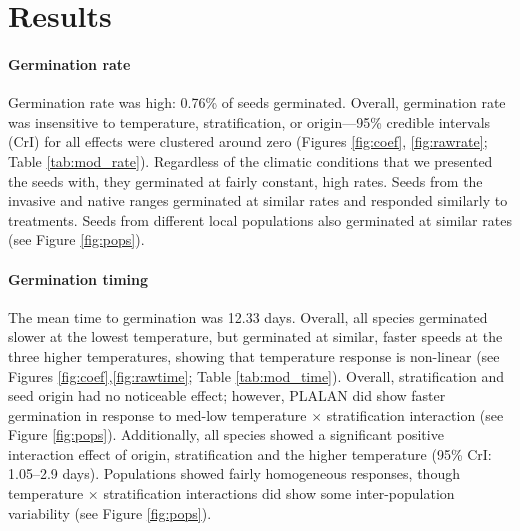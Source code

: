 \documentclass[12pt]{article}\usepackage[]{graphicx}\usepackage[]{color}
\begin{document}
	\section{Results}
	\paragraph{Germination rate} Germination rate was high: 0.76\% of seeds germinated. Overall, germination rate was insensitive to temperature, stratification, or origin---95\% credible intervals (CrI) for all effects were clustered around zero (Figures \ref{fig:coef}, \ref{fig:rawrate}; Table \ref{tab:mod_rate}). Regardless of the climatic conditions that we presented the seeds with, they germinated at fairly constant, high rates. Seeds from the invasive and native ranges germinated at similar rates and responded similarly to treatments. Seeds from different local populations also germinated at similar rates (see Figure \ref{fig:pops}).
	\paragraph{Germination timing} The mean time to germination was 12.33 days.  Overall, all species germinated slower at the lowest temperature, but germinated at similar, faster speeds at the three higher temperatures, showing that temperature response is non-linear  (see Figures \ref{fig:coef},\ref{fig:rawtime}; Table \ref{tab:mod_time}). Overall, stratification and seed origin had no noticeable effect; however, PLALAN did show faster germination in response to med-low temperature $\times$ stratification interaction (see Figure \ref{fig:pops}).  Additionally, all species showed a significant positive interaction effect of origin, stratification and the higher temperature (95\% CrI: 1.05--2.9 days). %
	Populations showed fairly homogeneous responses, though temperature $\times$ stratification interactions did show some inter-population variability (see Figure \ref{fig:pops}). 
\end{document}
